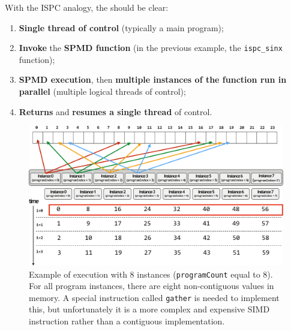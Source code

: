 \highspace
With the ISPC analogy, the  should be clear:
\begin{enumerate}
    \item \textbf{Single thread of control} (typically a main program);
    \item \textbf{Invoke} the \textbf{SPMD function} (in the previous example, the \texttt{ispc\_sinx} function);
    \item \textbf{SPMD execution}, then \textbf{multiple instances of the function run in parallel} (multiple logical threads of control);
    \item \textbf{Returns} and \textbf{resumes a single thread} of control.
\end{enumerate}

\newpage

\begin{figure}[!htp]
    \centering
    \includegraphics[width=\textwidth]{img/ispc-1.pdf}
    \begin{center}
        \includegraphics[width=\textwidth]{img/ispc-2.pdf}
    \end{center}
    \caption{Example of execution with 8 instances (\texttt{programCount} equal to 8). For all program instances, there are eight non-contiguous values in memory. A special instruction called \texttt{gather} is needed to implement this, but unfortunately it is a more complex and expensive SIMD instruction rather than a contiguous implementation.}
    \label{fig: ispc 8 instances, no optimized}
\end{figure}

